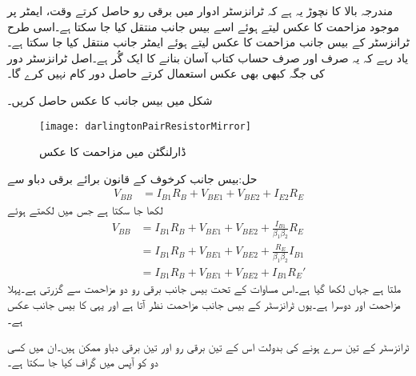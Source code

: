 مندرجہ بالا کا نچوڑ یہ ہے کہ ٹرانزسٹر ادوار میں برقی رو  حاصل کرتے وقت،  ایمٹر پر موجود مزاحمت کا عکس لیتے ہوئے اسے بیس جانب منتقل کیا جا سکتا ہے۔اسی طرح ٹرانزسٹر کے بیس جانب مزاحمت کا عکس لیتے ہوئے ایمٹر جانب منتقل کیا جا سکتا ہے۔یاد رہے کہ یہ صرف اور صرف حساب کتاب آسان بنانے کا ایک گُر ہے۔اصل ٹرانزسٹر دور کی جگہ کبھی بھی عکس استعمال کرتے حاصل دور کام نہیں کرے گا۔  

شکل  میں بیس جانب  کا عکس حاصل کریں۔
\begin{figure}
\centering
\texttt{[image: darlingtonPairResistorMirror]}
\caption{ڈارلنگٹن میں مزاحمت کا عکس}
\label{شکل_ٹرانزسٹر_ڈارلنگٹن_مزاحمت_عکس}
\end{figure}

حل:بیس جانب کرخوف کے قانون برائے برقی دباو سے
\begin{align*}
V_{BB}&=I_{B1} R_B +V_{BE1}+V_{BE2}+I_{E2} R_E
\end{align*}
لکھا جا سکتا ہے جس میں  لکھتے ہوئے
\begin{align*}
V_{BB}&=I_{B1} R_B +V_{BE1}+V_{BE2}+\frac{I_{B1}}{\beta_1 \beta_2} R_E\\
&=I_{B1} R_B +V_{BE1}+V_{BE2}+\frac{R_E}{\beta_1 \beta_2} I_{B1}\\
&=I_{B1} R_B +V_{BE1}+V_{BE2}+I_{B1} R_E'
\end{align*}
ملتا ہے جہاں  لکھا گیا ہے۔اس مساوات کے تحت بیس جانب برقی رو  دو مزاحمت سے گزرتی ہے۔پہلا مزاحمت  اور دوسرا  ہے۔یوں ٹرانزسٹر کے بیس جانب مزاحمت  نظر آتا ہے اور یہی  کا بیس جانب عکس ہے۔


\label{حصہ_ٹرانزسٹر_کے_خط}
	ٹرانزسٹر کے تین سرے ہونے کی بدولت اس کے تین برقی رو اور تین برقی دباو ممکن ہیں۔ان میں کسی دو کو آپس میں گراف کیا جا سکتا ہے۔

